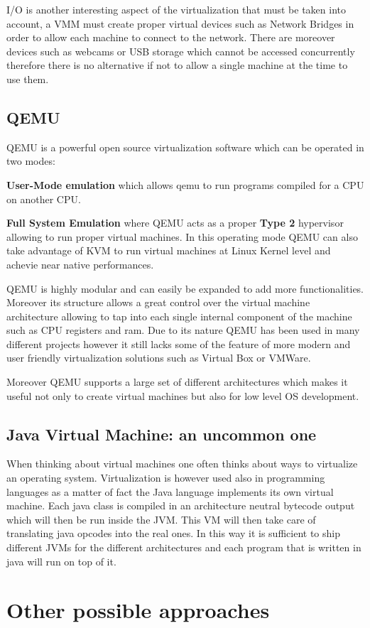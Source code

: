 I/O is another interesting aspect of the virtualization that must be taken into account, a VMM must create proper virtual devices such as Network Bridges in order to allow each machine to connect to the network. There are moreover devices such as webcams or USB storage which cannot be accessed concurrently therefore there is no alternative if not to allow a single machine at the time to use them.

\subsection{QEMU}

QEMU is a powerful open source virtualization software which can be operated in two modes: 

\textbf{User-Mode emulation} which allows qemu to run programs compiled for a CPU on another CPU.

\textbf{Full System Emulation} where QEMU acts as a proper \textbf{Type 2} hypervisor allowing to run proper virtual machines. In this operating mode QEMU can also take advantage of KVM to run virtual machines at Linux Kernel level and achevie near native performances. 

QEMU is highly modular and can easily be expanded to add more functionalities. Moreover its structure allows a great control over the virtual machine architecture allowing to tap into each single internal component of the machine such as CPU registers and ram. Due to its nature QEMU has been used in many different projects however it still lacks some of the feature of more modern and user friendly virtualization solutions such as Virtual Box or VMWare.

Moreover QEMU supports a large set of different architectures which makes it useful not only to create virtual machines but also for low level OS development.

\subsection{Java Virtual Machine: an uncommon one}

When thinking about virtual machines one often thinks about ways to virtualize an operating system. Virtualization is however used also in programming languages as a matter of fact the Java language implements its own virtual machine. Each java class is compiled in an architecture neutral bytecode output which will then be run inside the JVM. This VM will then take care of translating java opcodes into the real ones. In this way it is sufficient to ship different JVMs for the different architectures and each program that is written in java will run on top of it.  
\section{Other possible approaches}

